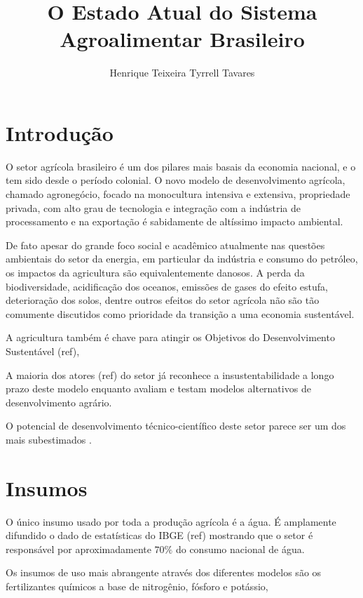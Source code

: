 \documentclass[]{article}
\title{O Estado Atual do Sistema Agroalimentar Brasileiro}
\author{Henrique Teixeira Tyrrell Tavares}
\begin{document}
\maketitle

\begin{abstract}

\end{abstract}

\section{Introdução}

O setor agrícola brasileiro é um dos pilares mais basais da economia nacional, e o tem sido desde o período colonial. O novo modelo de desenvolvimento agrícola, chamado agronegócio, focado na monocultura intensiva e extensiva, propriedade privada, com alto grau de tecnologia  e integração com a indústria de processamento e na exportação é sabidamente de altíssimo impacto ambiental.

De fato apesar do grande foco social e acadêmico atualmente nas questões ambientais do setor da energia, em particular da indústria e consumo do petróleo, os impactos da agricultura são equivalentemente danosos. A perda da biodiversidade, acidificação dos oceanos, emissões de gases do efeito estufa, deterioração dos solos, dentre outros efeitos do setor agrícola não são tão comumente discutidos como prioridade da transição a uma economia sustentável. 

A agricultura também é chave para atingir os Objetivos do Desenvolvimento Sustentável (ref), 

A maioria dos atores (ref) do setor já reconhece a insustentabilidade a longo prazo deste modelo enquanto avaliam e testam modelos alternativos de desenvolvimento agrário. 

O potencial de desenvolvimento técnico-científico deste setor parece ser um dos mais subestimados .



\section{Insumos}

O único insumo usado por toda a produção agrícola é a água. É amplamente difundido o dado de estatísticas do IBGE (ref) mostrando que o setor é responsável por aproximadamente $70\%$ do consumo nacional de água. 

Os insumos de uso mais abrangente através dos diferentes modelos são os fertilizantes químicos a base de nitrogênio, fósforo e potássio,  
\end{document}
